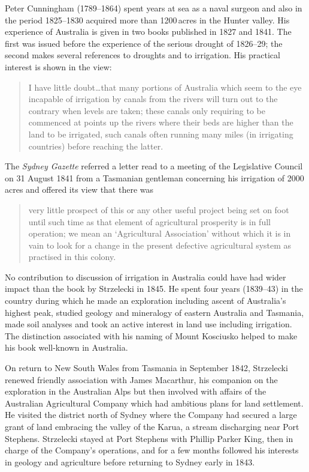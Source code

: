 Peter Cunningham (1789--1864)  spent years at
sea as a naval surgeon and also in the period 1825--1830 acquired more
than 1200\,acres in the Hunter valley.  His experience of Australia is
given in two books published in 1827 and 1841.  The first was issued
before the experience of the serious drought of 1826--29; the second
makes several references to droughts and to irrigation. His practical
interest is shown in the view:
\begin{quote}
	I have little doubt\ldots that many portions of Australia
	which seem to the eye incapable of irrigation by canals from
	the rivers will turn out to the contrary when levels are
	taken; these canals only requiring to be commenced at points
	up the rivers where their beds are higher than the land to be
	irrigated, such canals often running many miles (in irrigating
	countries) before reaching the
	latter.
\end{quote}

The \textsl{Sydney Gazette} referred a letter read to a meeting of the
Legislative Council on 31 August 1841 from a Tasmanian gentleman
concerning his irrigation of 2000\,acres and offered its view that
there was
\begin{quote}
	very little prospect of this or any other useful project being
	set on foot until such time as that element of agricultural
	prosperity is in full operation; we mean an `Agricultural
	Association' without which it is in vain to look for a change
	in the present defective agricultural system as practised in
	this colony.
\end{quote}

No contribution to discussion of irrigation in Australia could have
had wider impact than the book by Strzelecki  in
1845.  He spent four years (1839--43) in the country during which he
made an exploration including ascent of Australia's highest peak,
studied geology and mineralogy of eastern Australia and Tasmania, made
soil analyses and took an active interest in land use including
irrigation.  The distinction associated with his naming of Mount
Kosciusko  helped to make his book well-known
in Australia.

On return to New South Wales from Tasmania in September 1842,
Strzelecki renewed friendly association with James Macarthur,
 his
companion on the exploration in the Australian Alps but then involved
with affairs of the Australian Agricultural Company  which had ambitious plans for land settlement.  He
visited the district north of Sydney where the Company had secured a
large grant of land embracing the valley of the Karua, a stream
discharging near Port Stephens.   Strzelecki
stayed at Port Stephens with Phillip Parker King, 
then in charge of the Company's operations, and for a few months
followed his interests in geology and agriculture before returning to
Sydney early in 1843.

